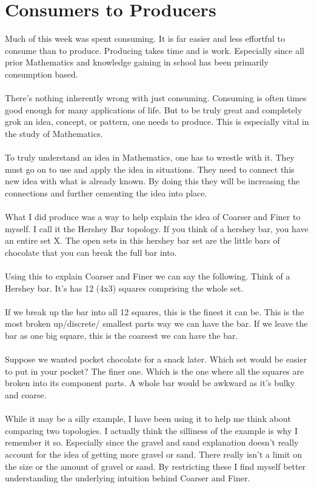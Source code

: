 \documentclass[10pt]{article}
\begin{document}
\newpage

\section{Consumers to Producers}
Much of this week was spent consuming. It is far easier and less effortful to consume than to produce. Producing takes time and is work. Especially since all prior Mathematics and knowledge gaining in school has been primarily consumption based. \\
\\
There's nothing inherently wrong with just consuming. Consuming is often times good enough for many applications of life. But to be truly great and completely grok an idea, concept, or pattern, one needs to produce. This is especially vital in the study of Mathematics. \\
\\
To truly understand an idea in Mathematics, one has to wrestle with it. They must go on to use and apply the idea in situations. They need to connect this new idea with what is already known. By doing this they will be increasing the connections and further cementing the idea into place.\\
\\ 
What I did produce was a way to help explain the idea of Coarser and Finer to myself. I call it the Hershey Bar topology. If you think of a hershey bar, you have an entire set X. The open sets in this hershey bar set are the little bars of chocolate that you can break the full bar into. \\
\\
Using this to explain Coarser and Finer we can say the following. Think of a Hershey bar. It's has 12 (4x3) squares comprising the whole set.\\
\\
If we break up the bar into all 12 squares, this is the finest it can be. This is the most broken up/discrete/ smallest parts way we can have the bar. If we leave the bar as one big square, this is the coarsest we can have the bar.\\
\\
Suppose we wanted pocket chocolate for a snack later. Which set would be easier to put in your pocket? The finer one. Which is the one where all the squares are broken into its component parts. A whole bar would be awkward as it's bulky and coarse.\\
\\
While it may be a silly example, I have been using it to help me think about comparing two topologies. I actually think the silliness of the example is why I remember it so. Especially since the gravel and sand explanation doesn't really account for the idea of getting more gravel or sand. There really isn't a limit on the size or the amount of gravel or sand. By restricting these I find myself better understanding the underlying intuition behind Coarser and Finer.\\
\end{document}
